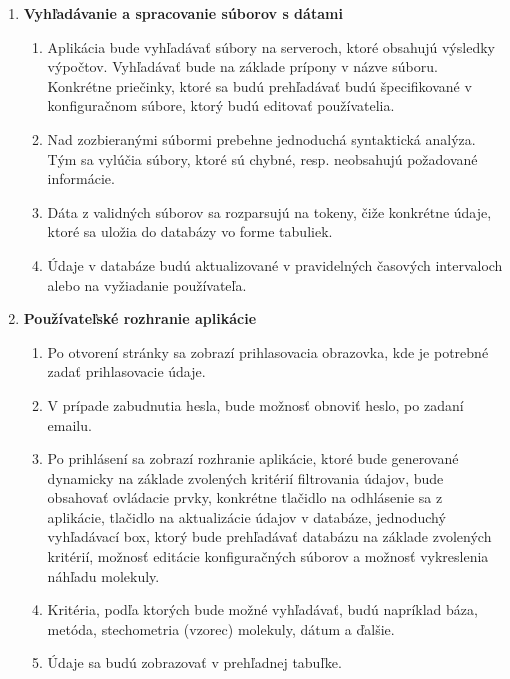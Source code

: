 \documentclass[12pt,a4paper, draft]{article}
\begin{document}
\begin{enumerate}
	\item { \bf Vyhľadávanie a spracovanie súborov s dátami } 
	\begin{enumerate}
		\item Aplikácia bude vyhľadávať súbory na serveroch, ktoré obsahujú výsledky výpočtov. Vyhľadávať bude na základe prípony v názve súboru. Konkrétne priečinky, ktoré sa budú prehľadávať budú špecifikované v konfiguračnom súbore, ktorý budú editovať používatelia.
		\item Nad zozbieranými súbormi prebehne jednoduchá syntaktická ana\-lýza. Tým sa vylúčia súbory, ktoré sú chybné, resp. neobsahujú požadované informácie.
		\item Dáta z validných súborov sa rozparsujú na tokeny, čiže konkrétne údaje, ktoré sa uložia do databázy vo forme tabuliek.
		\item Údaje v databáze budú aktualizované v pravidelných časových intervaloch alebo na vyžiadanie používateľa.
	\end{enumerate}
	\item { \bf  Používateľské rozhranie aplikácie } 
	\begin{enumerate}
		\item Po otvorení stránky sa zobrazí prihlasovacia obrazovka, kde je potrebné zadať prihlasovacie údaje.
		\item V prípade zabudnutia hesla, bude možnosť obnoviť heslo, po za\-daní emailu.
		\item Po prihlásení sa zobrazí rozhranie aplikácie, ktoré bude generované dynamicky na základe zvolených kritérií filtrovania údajov, bude obsahovať ovládacie prvky, konkrétne tlačidlo na odhlásenie sa z aplikácie, tlačidlo na aktualizácie údajov v databáze, jednoduchý vyhľadávací box, ktorý bude prehľadávať databázu na základe zvolených kritérií, možnosť editácie konfiguračných súborov a mož\-nosť vykreslenia náhľadu molekuly.
		\item Kritéria, podľa ktorých bude možné vyhľadávať, budú napríklad báza, metóda, stechometria (vzorec) molekuly, dátum a ďalšie.
		\item Údaje sa budú zobrazovať v prehľadnej tabuľke.
	\end{enumerate}
\end{enumerate}
\end{document}
